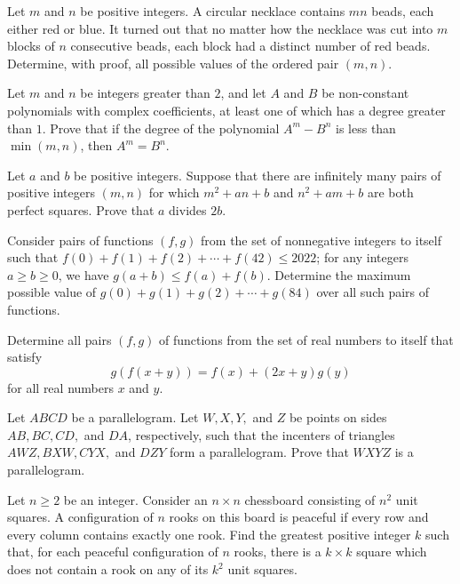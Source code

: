 \documentclass[11pt]{scrartcl}
\begin{document}
\begin{problem}[811235233671414145]
Let $m$ and $n$ be positive integers. A circular necklace contains $mn$ beads, each either red or blue. It turned out that no matter how the necklace was cut into $m$ blocks of $n$ consecutive beads, each block had a distinct number of red beads. Determine, with proof, all possible values of the ordered pair $(m, n)$.
\end{problem}
\begin{problem}[344307741773187]
Let $m$ and $n$ be integers greater than $2$, and let $A$ and $B$ be non-constant polynomials with complex coefficients, at least one of which has a degree greater than $1$. Prove that if the degree of the polynomial $A^m-B^n$ is less than $\min(m,n)$, then $A^m=B^n$.
\end{problem}
\begin{problem}[8948164820835424145]
Let $a$ and $b$ be positive integers. Suppose that there are infinitely many pairs of positive integers $(m,n)$ for which $m^2+an+b$ and $n^2+am+b$ are both perfect squares. Prove that $a$ divides $2b$.
\end{problem}
\begin{problem}[20663652231924]
Consider pairs of functions $(f, g)$ from the set of nonnegative integers to itself such that
$f(0) + f(1) + f(2) + \cdots + f(42) \le 2022$;
for any integers $a \ge b \ge 0$, we have $g(a+b) \le f(a) + f(b)$.
Determine the maximum possible value of $g(0) + g(1) + g(2) + \cdots + g(84)$ over all such pairs of functions.
\end{problem}
\begin{problem}[522601446762373]
Determine all pairs $(f,g)$ of functions from the set of real numbers to itself that satisfy\[g(f(x+y)) = f(x) + (2x + y)g(y)\]for all real numbers $x$ and $y$.
\end{problem}
\begin{problem}[7689980261025088265]
Let $ABCD$ be a parallelogram. Let $W, X, Y,$ and $Z$ be points on sides $AB, BC, CD,$ and $DA$, respectively, such that the incenters of triangles $AWZ, BXW, CYX,$ and $DZY$ form a parallelogram. Prove that $WXYZ$ is a parallelogram.
\end{problem}
\begin{problem}[317862961000833]
Let $n \ge 2$ be an integer. Consider an $n \times n$ chessboard consisting of $n^2$ unit squares. A configuration of $n$ rooks on this board is peaceful if every row and every column contains exactly one rook. Find the greatest positive integer $k$ such that, for each peaceful configuration of $n$ rooks, there is a $k \times k$ square which does not contain a rook on any of its $k^2$ unit squares.
\end{problem}
\end{document}
